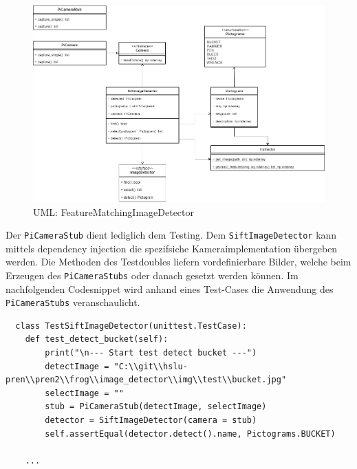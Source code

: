 \begin{figure}[H]
  \includegraphics[width=1\textwidth]{img/softwarearchitektur/UML-FeatureMatchingImageDetector.png}
  \centering
  \caption{UML: FeatureMatchingImageDetector}
  \label{fig:uml-feature-matching-image-detector}
\end{figure}

Der \texttt{PiCameraStub} dient lediglich dem Testing. Dem \texttt{SiftImageDetector} kann mittels dependency injection die spezifsiche Kameraimplementation übergeben werden. Die Methoden des Testdoubles liefern vordefinierbare Bilder, welche beim Erzeugen des \texttt{PiCameraStubs} oder danach gesetzt werden können. Im nachfolgenden Codesnippet wird anhand eines Test-Cases die Anwendung des \texttt{PiCameraStubs} veranschaulicht.

\begin{verbatim}
  class TestSiftImageDetector(unittest.TestCase):
    def test_detect_bucket(self):
        print("\n--- Start test detect bucket ---")
        detectImage = "C:\\git\\hslu-pren\\pren2\\frog\\image_detector\\img\\test\\bucket.jpg"
        selectImage = ""
        stub = PiCameraStub(detectImage, selectImage)
        detector = SiftImageDetector(camera = stub)
        self.assertEqual(detector.detect().name, Pictograms.BUCKET)
    
    ...
 \end{verbatim}

